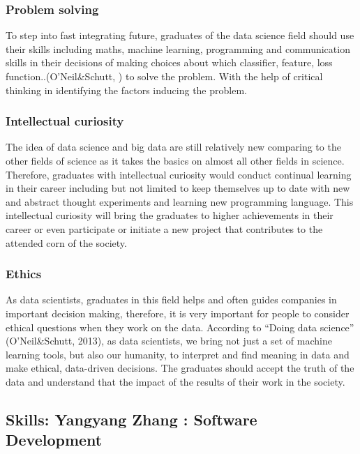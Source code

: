 \documentclass[a4paper, 11pt]{report}
\begin{document}
\subsubsection{Problem solving}
To step into fast integrating future, graduates of the data science field should use their skills including maths, machine learning, programming and communication skills in their decisions of making choices about which classifier, feature, loss function..(O’Neil&Schutt, ) to solve the problem. With the help of critical thinking in identifying the factors inducing the problem.

\subsubsection{Intellectual curiosity}
The idea of data science and big data are still relatively new comparing to the other fields of science as it takes the basics on almost all other fields in science. Therefore, graduates with intellectual curiosity would conduct continual learning in their career including but not limited to keep themselves up to date with new and abstract thought experiments and learning new programming language. This intellectual curiosity will bring the graduates to higher achievements in their career or even participate or initiate a new project that contributes to the attended corn of the society. 

\subsubsection{Ethics}
As data scientists, graduates in this field helps and often guides companies in important decision making, therefore, it is very important for people to consider ethical questions when they work on the data. According to “Doing data science” (O’Neil&Schutt, 2013), as data scientists, we bring not just a set of machine learning tools, but also our humanity, to interpret and find meaning in data and make ethical, data-driven decisions. The graduates should accept the truth of the data and understand that the impact of the results of their work in the society. 




\subsection{Skills: Yangyang Zhang : Software Development}
\end{document}
